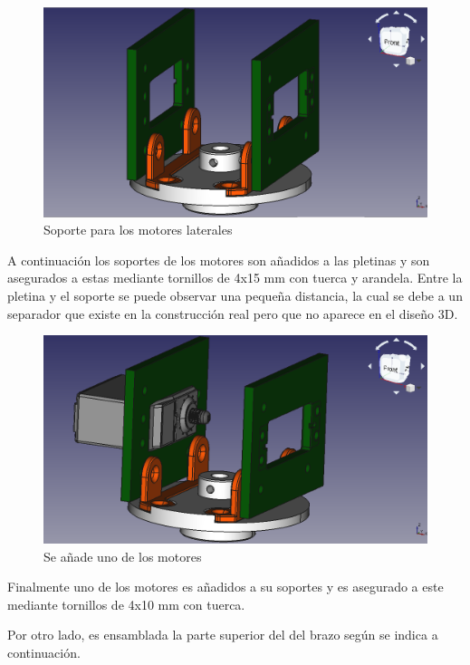 \begin{figure}[H]
    \centering 
    \includegraphics[width=1\linewidth]{pictures/BaseRotatoriaConPletinasYSoporte.png}
    \caption{Soporte para los motores laterales}
    \label{fig:soporte_motores_laterales}
\end{figure}

A continuación los soportes de los motores son añadidos a las pletinas y son asegurados a estas mediante tornillos de 4x15 mm con tuerca y arandela.
Entre la pletina y el soporte se puede observar una pequeña distancia, la cual se debe a un separador que existe en la construcción real pero que no aparece en el diseño 3D.

\begin{figure}[H]
    \centering 
    \includegraphics[width=1\linewidth]{pictures/BaseRotatoriaConUnMotor.png}
    \caption{Se añade uno de los motores}
    \label{fig:un_motor_añadido}
\end{figure}

Finalmente uno de los motores es añadidos a su soportes y es asegurado a este mediante tornillos de 4x10 mm con tuerca.

Por otro lado, es ensamblada la parte superior del del brazo según se indica a continuación.


